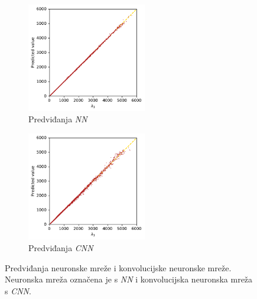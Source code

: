 \begin{figure}[htb!]
    \centering
    \begin{subfigure}{57mm}
        \centering
        \includegraphics[width = 52mm]{figures/neural_network_prediction.pdf}
        \caption{Predviđanja \emph{NN}}
        \label{fig:neural_network_prediction}
    \end{subfigure}
    \begin{subfigure}{57mm}
        \centering
        \includegraphics[width = 52mm]{figures/convolutional_neural_network_prediction.pdf}
        \caption{Predviđanja \emph{CNN}}
        \label{fig:convolutional_neural_network_prediction}
    \end{subfigure}
    \caption[Predviđanja neuronske mreže i konvolucijske neuronske mreže]{Predviđanja neuronske mreže i konvolucijske neuronske mreže. Neuronska mreža označena je s \emph{NN} i konvolucijska neuronska mreža s \emph{CNN}.}
    \label{fig:networks_predictions}
\end{figure}

\par%
\clearpage%
\newpage

